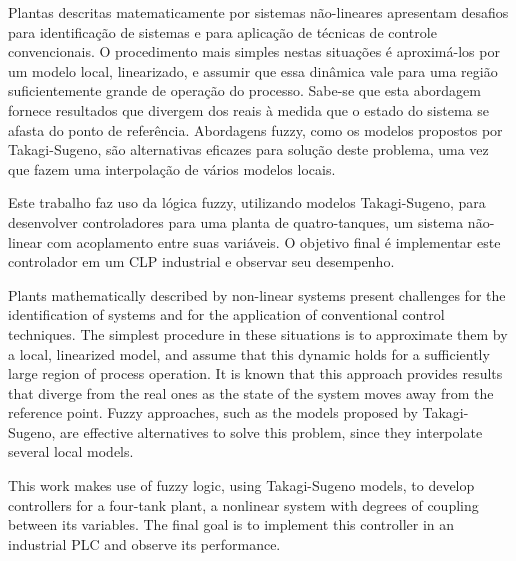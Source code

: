 %
{
	\indent Plantas descritas matematicamente por sistemas não-lineares apresentam desafios para identificação de sistemas e para aplicação de técnicas de controle convencionais. O procedimento mais simples nestas situações é aproximá-los por um modelo local, linearizado, e assumir que essa dinâmica vale para uma região suficientemente grande de operação do processo. Sabe-se que esta abordagem fornece resultados que divergem dos reais à medida que o estado do sistema se afasta do ponto de referência. Abordagens fuzzy, como os modelos propostos por Takagi-Sugeno, são alternativas eficazes para solução deste problema, uma vez que fazem uma interpolação de vários modelos locais.
	
	Este trabalho faz uso da lógica fuzzy, utilizando modelos Takagi-Sugeno, para desenvolver controladores para uma planta de quatro-tanques, um sistema não-linear com acoplamento entre suas variáveis. O objetivo final é implementar este controlador em um CLP industrial e observar seu desempenho.
}
\vspace*{2cm}
{
	\indent Plants mathematically described by non-linear systems present challenges for the identification of systems and for the application of conventional control techniques. The simplest procedure in these situations is to approximate them by a local, linearized model, and assume that this dynamic holds for a sufficiently large region of process operation. It is known that this approach provides results that diverge from the real ones as the state of the system moves away from the reference point. Fuzzy approaches, such as the models proposed by Takagi-Sugeno, are effective alternatives to solve this problem, since they interpolate several local models.
	
	This work makes use of fuzzy logic, using Takagi-Sugeno models, to develop controllers for a four-tank plant, a nonlinear system with degrees of coupling between its variables. The final goal is to implement this controller in an industrial PLC and observe its performance.
}%

